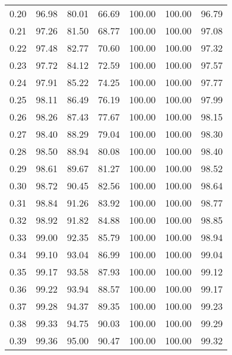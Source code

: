 \begin{tabular}{|c|c|c|c|c|c|c|}
      0.20 &     96.98 &     80.01 &      66.69 &  100.00 &     100.00 &         96.79 \\
      0.21 &     97.26 &     81.50 &      68.77 &  100.00 &     100.00 &         97.08 \\
      0.22 &     97.48 &     82.77 &      70.60 &  100.00 &     100.00 &         97.32 \\
      0.23 &     97.72 &     84.12 &      72.59 &  100.00 &     100.00 &         97.57 \\
      0.24 &     97.91 &     85.22 &      74.25 &  100.00 &     100.00 &         97.77 \\
      0.25 &     98.11 &     86.49 &      76.19 &  100.00 &     100.00 &         97.99 \\
      0.26 &     98.26 &     87.43 &      77.67 &  100.00 &     100.00 &         98.15 \\
      0.27 &     98.40 &     88.29 &      79.04 &  100.00 &     100.00 &         98.30 \\
      0.28 &     98.50 &     88.94 &      80.08 &  100.00 &     100.00 &         98.40 \\
      0.29 &     98.61 &     89.67 &      81.27 &  100.00 &     100.00 &         98.52 \\
      0.30 &     98.72 &     90.45 &      82.56 &  100.00 &     100.00 &         98.64 \\
      0.31 &     98.84 &     91.26 &      83.92 &  100.00 &     100.00 &         98.77 \\
      0.32 &     98.92 &     91.82 &      84.88 &  100.00 &     100.00 &         98.85 \\
      0.33 &     99.00 &     92.35 &      85.79 &  100.00 &     100.00 &         98.94 \\
      0.34 &     99.10 &     93.04 &      86.99 &  100.00 &     100.00 &         99.04 \\
      0.35 &     99.17 &     93.58 &      87.93 &  100.00 &     100.00 &         99.12 \\
      0.36 &     99.22 &     93.94 &      88.57 &  100.00 &     100.00 &         99.17 \\
      0.37 &     99.28 &     94.37 &      89.35 &  100.00 &     100.00 &         99.23 \\
      0.38 &     99.33 &     94.75 &      90.03 &  100.00 &     100.00 &         99.29 \\
      0.39 &     99.36 &     95.00 &      90.47 &  100.00 &     100.00 &         99.32 \\

\end{tabular}
